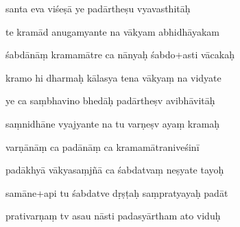\documentclass[article,12pt,a4paper]{memoir}%
\newcounter{parCount}
\begin{document}
	  
	  \pstart {} santa eva viśeṣā ye padārtheṣu vyavasthitāḥ 
	{}
	\pend%
      

	  
	  \pstart \leavevmode%
	te kramād anugamyante na vākyam abhidhāyakam 
	{}
	\pend%
      

	  
	  \pstart {} śabdānāṃ kramamātre ca nānyaḥ śabdo+asti vācakaḥ 
	{}
	\pend%
      

	  
	  \pstart \leavevmode%
	kramo hi dharmaḥ kālasya tena vākyaṃ na vidyate 
	{}
	\pend%
      

	  
	  \pstart {} ye ca saṃbhavino bhedāḥ padārtheṣv avibhāvitāḥ 
	{}
	\pend%
      

	  
	  \pstart \leavevmode%
	saṃnidhāne vyajyante na tu varṇeṣv ayaṃ kramaḥ 
	{}
	\pend%
      

	  
	  \pstart {} varṇānāṃ ca padānāṃ ca kramamātraniveśinī 
	{}
	\pend%
      

	  
	  \pstart \leavevmode%
	padākhyā vākyasaṃjñā ca śabdatvaṃ neṣyate tayoḥ 
	{}
	\pend%
      

	  
	  \pstart {} samāne+api tu śabdatve dṛṣṭaḥ saṃpratyayaḥ padāt 
	{}
	\pend%
      

	  
	  \pstart \leavevmode%
	prativarṇaṃ tv asau nāsti padasyārtham ato viduḥ 
	{}
	\pend%
      
\end{document}
